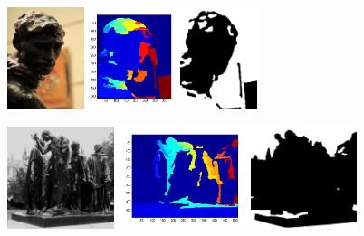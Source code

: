 \documentclass{article}
\begin{document}
\begin{figure}
\begin{centering}
\includegraphics[height=3cm]{images/Rodin_Burghers_of_Calais_0097}\includegraphics[height=3cm]{images/Rodin_Burghers_of_Calais_0097_gpb}\includegraphics[height=3cm]{images/Rodin_Burghers_of_Calais_0097_MASK}
\par\end{centering}

\centering{}\includegraphics[height=3cm]{images/Rodin_Burghers_of_Calais_0235}\includegraphics[height=3cm]{images/Rodin_Burghers_of_Calais_0235_gpb}\includegraphics[height=3cm]{images/Rodin_Burghers_of_Calais_0235_MASK}
\end{figure}
\end{document}
